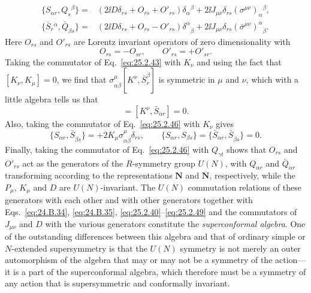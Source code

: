 \begin{equation}
\begin{aligned}
\{S_{\alpha r},Q_s{}^\beta\}
={}&\left(2\ii D\delta_{rs}+O_{rs}+O'_{rs}\right)
  \delta_\alpha{}^\beta
+2\ii J_{\mu\nu}\delta_{rs}
  (\sigma^{\mu\nu})_\alpha{}^\beta,
\\
\{\bar S_r{}^{\dot\alpha},\bar Q_{\dot\beta s}\}
={}&\left(2\ii D\delta_{rs}+O_{rs}-O'_{rs}\right)
  \delta^{\dot\alpha}{}_{\dot\beta}
+2\ii J_{\mu\nu}\delta_{rs}
  (\bar\sigma^{\mu\nu})^{\dot\alpha}{}_{\dot\beta}.
\end{aligned}
\tag{25.2.46}\label{eq:25.2.46}
\end{equation}
Here \(O_{rs}\) and \(O'_{rs}\) are Lorentz invariant operators of zero
dimensionality with
\begin{equation}
O_{rs}=-O_{sr},
\qquad
O'_{rs}=+O'_{sr}.
\tag{25.2.47}\label{eq:25.2.47}
\end{equation}
Taking the commutator of Eq.~\eqref{eq:25.2.43} with \(K_\nu\) and using
the fact that \([K_\nu,K_\mu]=0\), we find that
\(\sigma^\mu_{\alpha\dot\beta}
[K^\nu,\bar S_r^{\dot\beta}]\) is symmetric in \(\mu\) and \(\nu\),
which with a little algebra tells us that
\begin{equation}
[K^\nu,S_{\alpha r}]
=[K^\nu,\bar S_{\dot\alpha r}]=0.
\tag{25.2.48}\label{eq:25.2.48}
\end{equation}
Also, taking the commutator of Eq.~\eqref{eq:25.2.46} with \(K_\nu\)
gives
\begin{equation}
\{S_{\alpha r},\bar S_{\dot\beta s}\}
=+2K_\mu\sigma^\mu_{\alpha\dot\beta}\delta_{rs},
\qquad
\{S_{\alpha r},S_{\beta s}\}
=\{\bar S_{\dot\alpha r},\bar S_{\dot\beta s}\}=0.
\tag{25.2.49}\label{eq:25.2.49}
\end{equation}
Finally, taking the commutator of Eq.~\eqref{eq:25.2.46} with
\(Q_{\gamma t}\) shows that \(O_{rs}\) and \(O'_{rs}\) act as the
generators of the \(R\)-symmetry group \(U(N)\), with \(Q_{\alpha r}\)
and \(\bar Q_{\dot\alpha r}\) transforming according to the
representations \(\mathbf N\) and \(\overline{\mathbf N}\),
respectively, while the \(P_\mu\), \(K_\mu\) and \(D\) are
\(U(N)\)-invariant. The \(U(N)\) commutation relations of these generators
with each other and with other generators together with
Eqs.~\eqref{eq:24.B.34}, \eqref{eq:24.B.35},
\eqref{eq:25.2.40}--\eqref{eq:25.2.49} and the commutators of
\(J_{\mu\nu}\) and \(D\) with the various generators constitute the
\emph{superconformal algebra}. One of the outstanding differences between
this algebra and that of ordinary simple or \(N\)-extended supersymmetry is
that the \(U(N)\) symmetry is not merely an outer automorphism of the
algebra that may or may not be a symmetry of the action---it is a part of
the superconformal algebra, which therefore must be a symmetry of any
action that is supersymmetric and conformally invariant.
